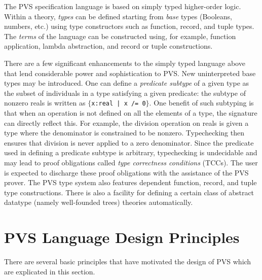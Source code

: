 The PVS specification language is based on simply typed higher-order
logic.  Within a theory, \emph{types} can be defined starting from
\emph{base} types (Booleans, numbers, etc.) using type constructors such
as function, record, and tuple types.  The \emph{terms} of the language
can be constructed using, for example, function application, lambda
abstraction, and record or tuple constructions.

There are a few significant enhancements to the simply typed language
above that lend considerable power and sophistication to PVS.  New
uninterpreted base types may be introduced.  One can define a
\emph{predicate subtype} of a given type as the subset of individuals in a
type satisfying a given predicate: the subtype of nonzero reals is
written as \texttt{$\{$x:real | x /= 0$\}$}.  One benefit of such
subtyping is that when an operation is not defined on all the elements of
a type, the signature can directly reflect this.  For example, the
division operation on reals is given a type where the denominator is
constrained to be nonzero.  Typechecking then ensures that
division is never applied to a zero denominator.  Since the predicate used
in defining a predicate subtype is arbitrary, typechecking is undecidable
and may lead to proof obligations called \emph{type correctness
conditions} (TCCs).  The user is expected to discharge these proof
obligations with the assistance of the PVS prover.  The PVS type system
also features dependent function, record, and tuple type constructions.
There is also a facility for defining a certain class of abstract datatype
(namely well-founded trees) theories automatically.

\section{PVS Language Design Principles}

There are several basic principles that have motivated the design of
PVS which are explicated in this section.

